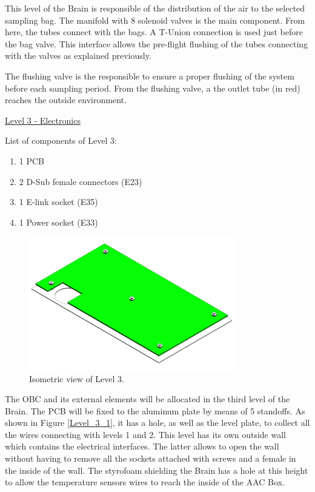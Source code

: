 \smallskip
This level of the Brain is responsible of the distribution of the air to the selected sampling bag. The manifold with 8 solenoid valves is the main component. From here, the tubes connect with the bags. A T-Union connection is used just before the bag valve. This interface allows the pre-flight flushing of the tubes connecting with the valves as explained previously. 

\smallskip
The flushing valve is the responsible to ensure a proper flushing of the system before each sampling period. From the flushing valve, a the outlet tube (in red) reaches the outside environment. 



\pagebreak
\underline{Level 3 - Electronics}


List of components of Level 3:
\begin{enumerate}[label=\Alph*.]
    \item 1 PCB
    \item 2 D-Sub female connectors (E23)
    \item 1 E-link socket (E35)
    \item 1 Power socket (E33)
\end{enumerate}


\begin{figure}[H]
    \centering
    \includegraphics[width=0.8\textwidth]{4-experiment-design/img/Mechanical/Level_3.png}
    \caption{Isometric view of Level 3.}
    \label{level_3}
\end{figure}

\smallskip
The OBC and its external elements will be allocated in the third level of the Brain. The PCB will be fixed to the aluminum plate by means of 5 standoffs. As shown in Figure \ref{Level_3_1}, it has a hole, as well as the level plate, to collect all the wires connecting with levels 1 and 2. This level has its own outside wall which contains the electrical interfaces. The latter allows to open the wall without having to remove all the sockets attached with screws and a female in the inside of the wall. The styrofoam shielding the Brain has a hole at this height to allow the temperature sensors wires to reach the inside of the AAC Box. 

